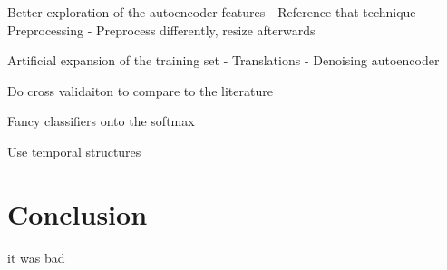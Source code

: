     Better exploration of the autoencoder features
      - Reference that technique
    Preprocessing
      - Preprocess differently, resize afterwards

    Artificial expansion of the training set
      - Translations
      - Denoising autoencoder

    Do cross validaiton to compare to the literature

    Fancy classifiers onto the softmax

    Use temporal structures

\chapter{Conclusion}
  it was bad
